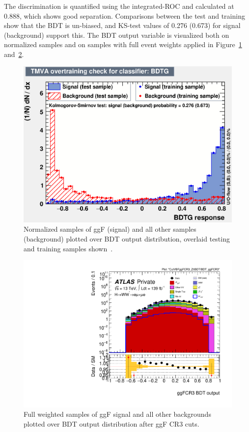 The discrimination is quantified using the integrated-ROC and calculated at 0.888, which shows good separation. Comparisons between the test and training show that the BDT is un-biased, and KS-test values of 0.276 (0.673) for signal (background) support this. The BDT output variable is visualized both on normalized samples and on samples with full event weights applied in Figure~\ref{fig:ggFCR3BDTresult} and~\ref{fig:ggFCR3BDTresult2}.

\begin{figure}[!htbp]
\centering
  \includegraphics[width=.45\linewidth]{Pictures/ggFCR3/overtrain_BDTG.eps}
\caption{Normalized samples of ggF (signal) and all other samples (background) plotted over BDT output distribution, overlaid testing and training samples shown~\cite{ourSupportNote}.}
\label{fig:ggFCR3BDTresult}
\end{figure}

\begin{figure}[!htbp]
\centering
  \includegraphics[width=.45\linewidth]{Pictures/run2-emme-CutVBFggFCR3_ZttBDT-BDT_ggFCR3-log.pdf}
\caption{Full weighted samples of ggF signal and all other backgrounds plotted over BDT output distribution after ggF CR3 cuts.}
\label{fig:ggFCR3BDTresult2}
\end{figure}

\newpage
